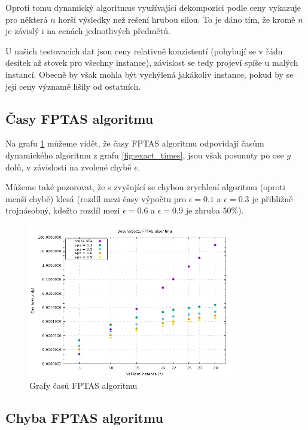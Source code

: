 \documentclass[11pt]{article}
\begin{document}
Oproti tomu dynamický algoritmus využívající dekompozici podle ceny vykazuje pro některá $n$ horší výsledky než rešení hrubou silou. To je dáno tím, že kromě $n$ je závislý i na cenách jednotlivých předmětů. 

U našich testovacích dat jsou ceny relativně konzistentí (pohybují se v řádu desítek až stovek pro všechny instance), závislost se tedy projeví spíše u malých instancí. Obecně by však mohla být vychýlená jakákoliv instance, pokud by se její ceny významě lišily od ostatních.

\subsection{Časy FPTAS algoritmu}

Na grafu \ref{fig:apx_times} můžeme vidět, že časy FPTAS algoritmu odpovídají časům dynamického algoritmu z grafu \ref{fig:exact_times}, jsou však posunuty po ose $y$ dolů, v závislosti na zvolené chybě $\epsilon$. 

Můžeme také pozorovat, že s zvyšující se chybou zrychlení algoritmu (oproti menší chybě) klesá (rozdíl mezi časy výpočtu pro $\epsilon = 0.1$ a $\epsilon = 0.3$ je přibližně trojnásobný, kdežto rozdíl mezi $\epsilon = 0.6$ a $\epsilon = 0.9$ je zhruba 50\%).

\begin{figure}[h!]
	\centering
    	\includegraphics[width=0.8\textwidth]{apx_times.png}
    	\caption{Grafy časů FPTAS algoritmu}
	\label{fig:apx_times}
\end{figure}

\subsection{Chyba FPTAS algoritmu}
\end{document}
